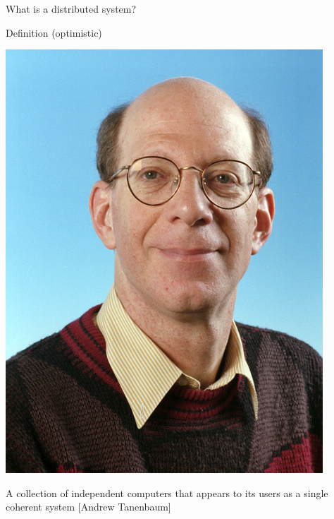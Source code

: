 \begin{frame}{What is a distributed system?}

\begin{block}{Definition (optimistic)}
\begin{minipage}{0.15\textwidth}
\includegraphics[width=\textwidth]{figs/01/tanenbaum.jpg}
\end{minipage}
\hfill
\begin{minipage}{0.80\textwidth}
A collection of independent computers that appears to its users as a single coherent system [Andrew Tanenbaum]
\end{minipage}
\end{block}


\end{frame}
